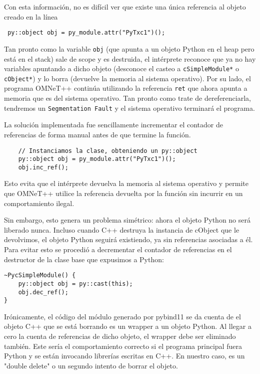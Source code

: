 \documentclass[]{article}
\begin{document}
Con esta información, no es difícil ver que existe una única referencia al
objeto creado en la línea

\begin{verbatim}
 py::object obj = py_module.attr("PyTxc1")();
\end{verbatim}

Tan pronto como la variable \verb!obj! (que apunta a un objeto Python en el
heap pero está en el stack) sale de scope y es destruida, el intérprete
reconoce que ya no hay variables apuntando a dicho objeto (desconoce el casteo
a \verb!cSimpleModule*! o \verb!cObject*!) y lo borra (devuelve la memoria al
sistema operativo). Por su lado, el programa OMNeT++ continúa utilizando la
referencia \verb!ret! que ahora apunta a memoria que es del sistema operativo.
Tan pronto como trate de dereferenciarla, tendremos un \verb!Segmentation Fault!
y el sistema operativo terminará el programa.

La solución implementada fue sencillamente incrementar el contador de
referencias de forma manual antes de que termine la función. 

\begin{verbatim}
    // Instanciamos la clase, obteniendo un py::object
    py::object obj = py_module.attr("PyTxc1")();
    obj.inc_ref();
\end{verbatim}

Esto evita que el intérprete devuelva la memoria al sistema operativo y permite
que OMNeT++ utilice la referencia devuelta por la función sin incurrir en un
comportamiento ilegal.

Sin embargo, esto genera un problema simétrico: ahora el objeto Python no será
liberado nunca. Incluso cuando C++ destruya la instancia de cObject que le
devolvimos, el objeto Python seguirá existiendo, ya sin referencias asociadas a
él. Para evitar esto se procedió a decrementar el contador de referencias en el
destructor de la clase base que expusimos a Python:

\begin{verbatim}
~PycSimpleModule() {
    py::object obj = py::cast(this);
    obj.dec_ref();
} 
\end{verbatim}

Irónicamente, el código del módulo generado por pybind11 se da cuenta de el
objeto C++ que se está borrando es un wrapper a un objeto Python. Al llegar a
cero la cuenta de referencias de dicho objeto, el wrapper debe ser eliminado
también. Este sería el comportamiento correcto si el programa principal fuera
Python y se están invocando librerías escritas en C++. En nuestro caso, es un
"double delete" o un segundo intento de borrar el objeto.
\end{document}
